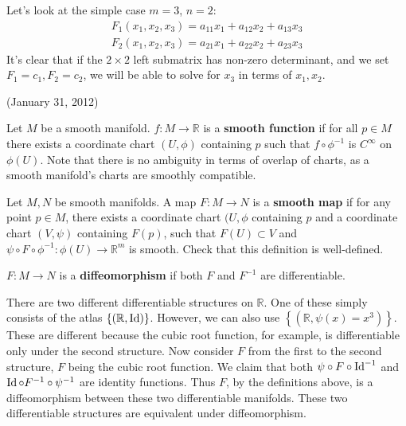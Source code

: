 \documentclass{../mathnotes}
\begin{document}
\begin{exmp}
Let's look at the simple case $m=3$, $n=2$:
\begin{align*}
    F_1(x_1,x_2,x_3)=a_{11}x_1+a_{12}x_2+a_{13}x_3\\
    F_2(x_1,x_2,x_3)=a_{21}x_1+a_{22}x_2+a_{23}x_3
\end{align*}
It's clear that if the $2\times2$ left submatrix has non-zero determinant, and we set $F_1=c_1,F_2=c_2$, we will be able to solve for $x_3$ in terms of $x_1,x_2$.
\end{exmp}

(January 31, 2012)
\begin{defn}
    Let $M$ be a smooth manifold. $f:M\to\mathbb{R}$ is a \textbf{smooth function} if for all $p\in M$ there exists a coordinate chart 
    $(U,\phi)$ containing $p$ such that $f\circ \phi^{-1}$ is $C^\infty$ on $\phi(U)$. Note that there is no ambiguity in terms of overlap of charts,
    as a smooth manifold's charts are smoothly compatible.
\end{defn}

\begin{defn}
    Let $M, N$ be smooth manifolds. A map $F:M\to N$ is a \textbf{smooth map} if for any point $p\in M$, there exists a coordinate chart $(U,\phi$ containing
    $p$ and a coordinate chart $(V,\psi)$ containing $F(p)$, such that $F(U)\subset V$ and $\psi\circ F\circ \phi^{-1}:\phi(U)\to\mathbb{R}^m$ is smooth.
    Check that this definition is well-defined.
\end{defn}

\begin{defn}
    $F:M\to N$ is a \textbf{diffeomorphism} if both $F$ and $F^{-1}$ are differentiable.
\end{defn}

\begin{exmp}
    There are two different differentiable structures on $\mathbb{R}$. One of these simply consists of the atlas $\left\{ (\mathbb{R},\operatorname{Id}) \right\}$. However,
    we can also use $\left\{ (\mathbb{R},\psi(x)=x^3) \right\}$. These are different because the cubic root function, for example, is differentiable only under
    the second structure. Now consider $F$ from the first to the second structure, $F$ being the cubic root function. We claim that both $\psi\circ F\circ \operatorname{Id}^{-1}$
    and $\operatorname{Id}\circ F^{-1}\circ \psi^{-1}$ are identity functions. Thus $F$, by the definitions above, is a diffeomorphism between these two differentiable manifolds.
    These two differentiable structures are equivalent under diffeomorphism.
\end{exmp}
\end{document}
